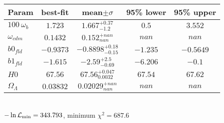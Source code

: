 \begin{tabular}{|l|c|c|c|c|} 
 \hline 
Param & best-fit & mean$\pm\sigma$ & 95\% lower & 95\% upper \\ \hline 
$100~\omega_{b }$ &$1.723$ & $1.667_{-1.2}^{+0.37}$ & $0.5$ & $3.552$ \\ 
$\omega_{cdm }$ &$0.1432$ & $0.152_{nan}^{+nan}$ & $nan$ & $nan$ \\ 
$b0_{fld }$ &$-0.9373$ & $-0.8898_{-0.15}^{+0.18}$ & $-1.235$ & $-0.5649$ \\ 
$b1_{fld }$ &$-1.615$ & $-2.59_{-0.69}^{+2.5}$ & $-6.206$ & $-0.1$ \\ 
$H0$ &$67.56$ & $67.56_{0.0032}^{+0.047}$ & $67.54$ & $67.62$ \\ 
$\Omega_{\Lambda }$ &$0.03832$ & $0.02029_{nan}^{+nan}$ & $nan$ & $nan$ \\ 
\hline 
 \end{tabular} \\ 
$-\ln{\cal L}_\mathrm{min} =343.793$, minimum $\chi^2=687.6$ \\ 
